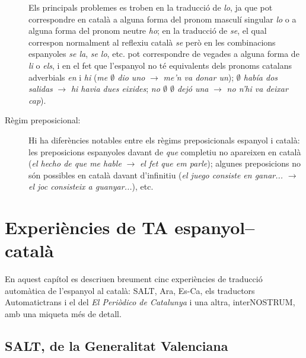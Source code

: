\begin{description}
Els principals problemes es troben en la traducció de \emph{lo}, ja que
pot correspondre 
en català a alguna forma del pronom masculí singular {\em
  lo} o a alguna forma del
pronom neutre \emph{ho}; en la traducció de 
\emph{se}, el qual correspon normalment al reflexiu 
català \emph{se} però
en les combinacions espanyoles \emph{se la}, \emph{se lo}, etc. pot
correspondre de vegades a alguna forma de \emph{li} o \emph{els}, i en
el fet que l'espanyol no té equivalents dels pronoms catalans
adverbials \emph{en} i \emph{hi}  (\emph{me $\emptyset$ dio uno}
$\rightarrow$
\emph{me'n va donar un}); \emph{$\emptyset$ había dos salidas}
$\rightarrow$ \emph{hi havia dues eixides}; \emph{no $\emptyset$
  $\emptyset$ dejó una} $\rightarrow$ \emph{no n'hi va deixar cap}).
\item[Règim preposicional:] Hi ha diferències notables entre
  els règims preposicionals espanyol i català: les
  preposicions espanyoles davant de \emph{que} completiu no apareixen
  en català (\emph{el hecho de que me hable} $\rightarrow$ \emph{el
    fet que em parle}); algunes preposicions no són possibles en català
  davant d'infinitiu (\emph{el juego consiste en ganar...}
  $\rightarrow$ \emph{el joc consisteix a guanyar...}), etc.
\end{description}

\section{Experiències de TA espanyol--català}
\label{se:ETACC}

En aquest capítol es descriuen breument cinc experiències de traducció
automàtica de l'espanyol al català: SALT, Ara, Es-Ca, els traductors
Automatictrans i el del \textit{El Periòdico de Catalunya} i una
altra, interNOSTRUM, amb una miqueta més de detall.

\subsection{SALT, de la Generalitat Valenciana}


